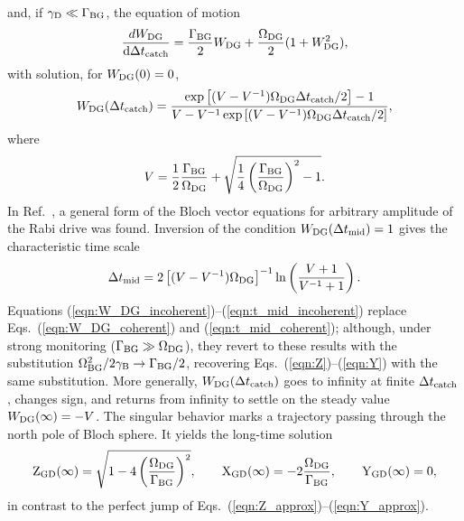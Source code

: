 \documentclass[
						superscriptaddress, 																 amsmath, amssymb,
		 aps,  prb,  
										floatfix,
		linenumbers,
			]{revtex4-1}
\begin{document}
and, if $\gamma_{\rm D}\ll\Gamma_{\rm BG}$, the equation of motion
\begin{equation}
\frac{dW_{\rm DG}}{\mathrm{d}\Delta t_{\rm catch}}=\frac{\Gamma_{\rm BG}}2W_{\rm DG}+\frac{\Omega_{\rm DG}}2(1+W_{\rm DG}^2),
\label{eqn:W_DG_equation_incoherent}
\end{equation}
with solution, for $W_{\rm DG}(0)=0$,
\begin{equation}
W_{\rm DG}(\Delta t_{\rm catch})=\frac{\exp\left[(V-V^{-1})\Omega_{\rm DG}\Delta t_{\rm catch}/2\right]-1}{V-V^{-1}\exp\left[(V-V^{-1})\Omega_{\rm DG}\Delta t_{\rm catch}/2\right]},
\label{eqn:W_DG_incoherent}
\end{equation}
where
\begin{equation}
V=\frac12\frac{\Gamma_{\rm BG}}{\Omega_{\rm DG}}+\sqrt{\frac14\left(\frac{\Gamma_{\rm BG}}{\Omega_{\rm DG}}\right)^2-1}.
\end{equation}
In Ref.~, a general form of the Bloch vector equations for arbitrary amplitude of the Rabi drive was found.
Inversion of the condition $W_{\rm DG}(\Delta  t_{\rm mid})=1$ gives the characteristic time scale
\begin{equation}
\Delta t_{\rm mid}=2\left[(V-V^{-1})\Omega_{\rm DG}\right]^{-1}\ln\left(\frac{V+1}{V^{-1}+1}\right).
\label{eqn:t_mid_incoherent}
\end{equation}
Equations (\ref{eqn:W_DG_incoherent})--(\ref{eqn:t_mid_incoherent}) replace Eqs.~(\ref{eqn:W_DG_coherent}) and (\ref{eqn:t_mid_coherent}); although, under strong monitoring ($\Gamma_{\rm BG}\gg\Omega_{\rm DG}$), they revert to these results with the substitution $\Omega_{\rm BG}^2/2\gamma_{\rm B}\to\Gamma_{\rm BG}/2$, recovering Eqs.~(\ref{eqn:Z})--(\ref{eqn:Y}) with the same substitution. More generally, $W_{\rm DG}(\Delta t_{\rm catch})$ goes to infinity at finite $\Delta t_{\rm catch}$, changes sign, and returns  from infinity to settle on the steady value $W_{\rm DG}(\infty)=-V$. The singular behavior marks a trajectory passing through the north pole of Bloch sphere. It yields the long-time solution
\begin{eqnarray}
{\rm Z}_{\rm GD}(\infty)=\sqrt{1-4\left(\frac{\Omega_{\rm DG}}{\Gamma_{\rm BG}}\right)^2},\qquad
{\rm X}_{\rm GD}(\infty)=-2\frac{\Omega_{\rm DG}}{\Gamma_{\rm BG}},\qquad
{\rm Y}_{\rm GD}(\infty)=0,
\label{eq:XYZ_GD-inf}
\end{eqnarray}
in contrast to the perfect jump of Eqs.~(\ref{eqn:Z_approx})--(\ref{eqn:Y_approx}).
\end{document}
